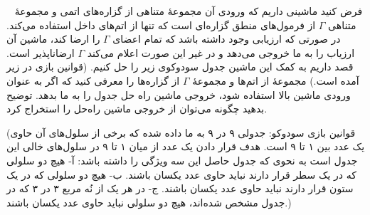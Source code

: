 ~
فرض کنید ماشینی داریم که ورودی آن مجموعهٔ متناهی  \textsc{} از گزاره‌های اتمی و مجموعهٔ متناهی $\Gamma$ از فرمول‌های منطق گزاره‌ای است که تنها از اتم‌های داخل \textsc{} استفاده می‌کند. در صورتی که ارزیابی وجود داشته باشد که تمام اعضای $\Gamma$ را ارضا کند، ماشین آن ارزیاب را به ما خروجی می‌دهد و در غیر این صورت اعلام می‌کند $\Gamma$ ارضاناپذیر است. قصد داریم به کمک این ماشین جدول سودوکوی زیر را حل کنیم. (قوانین بازی در زیر آمده است.) مجموعهٔ \textsc{} از اتم‌ها و مجموعهٔ $\Gamma$ از گزاره‌ها را معرفی کنید که اگر به عنوان ورودی ماشین بالا استفاده شود، خروجی ماشین راه حل جدول را به ما بدهد. توضیح بدهید چگونه می‌توان از خروجی ماشین راه‌حل را استخراج کرد.
\vspace*{5mm}
\begin{LTR}\centering
  \cluefont{\normalsize}
\end{LTR}
\vspace*{5mm}
(قوانین بازی سودوکو: جدولی ۹ در ۹ به ما داده شده که برخی از سلول‌های آن حاوی یک عدد بین ۱ تا ۹ است. هدف قرار دادن یک عدد از میان ۱ تا ۹ در سلول‌های خالی این جدول است به نحوی که جدول حاصل این سه ویژگی را داشته باشد: آ- هیچ دو سلولی که در یک سطر قرار دارند نباید حاوی عدد یکسان باشند. ب- هیچ دو سلولی که در یک ستون قرار دارند نباید حاوی عدد یکسان باشند. ج- در هر یک از نُه مربع ۳ در ۳ که در جدول مشخص شده‌اند، هیچ دو سلولی نباید حاوی عدد یکسان باشند.)